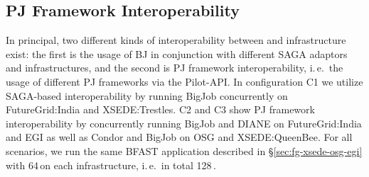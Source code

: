 \documentclass[conference]{IEEEtran}
\begin{document}






\subsection{PJ Framework Interoperability}
\label{sec:experiment-interop}

In principal, two different kinds of interoperability between
\pilotjobs and infrastructure exist: the first is the usage of BJ in
conjunction with different SAGA adaptors and infrastructures, and the
second is PJ framework interoperability, i.\,e.\ the usage of
different PJ frameworks via the Pilot-API. In configuration C1 we
utilize SAGA-based interoperability by running BigJob concurrently on
FutureGrid:India and XSEDE:Trestles. C2 and C3 show PJ
framework interoperability by concurrently running BigJob and DIANE on
FutureGrid:India and EGI as well as Condor and BigJob on OSG and
XSEDE:QueenBee. For all scenarios, we run the same BFAST application
described in \S\ref{sec:fg-xsede-osg-egi} with 64\,\cus on each
infrastructure, i.\,e.\ in total 128\,\cus.
\end{document}
